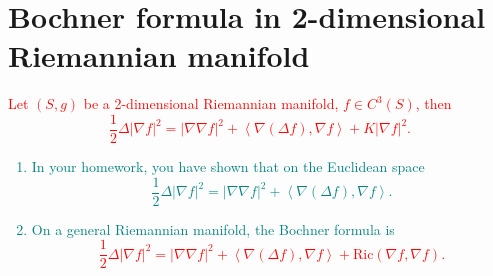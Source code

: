 \section{Bochner formula in 2-dimensional Riemannian manifold}
\textcolor{red}{
    \begin{theorem}
        Let \((S,g)\) be a 2-dimensional Riemannian manifold,
        \(f\in C^3(S)\), then
        \[
            \frac{1}{2}\Delta |\nabla f|^2 =|\nabla\nabla f|^2+\left\langle
                \nabla\left(\Delta f\right),\nabla f\right\rangle 
                +K|\nabla f|^2.   
        \]
    \end{theorem}
}
\textcolor{teal}{
    \begin{remark}
        \begin{enumerate}[(1)]
            \item In your homework, you have shown that on the
            Euclidean space
            \[\frac{1}{2}\Delta |\nabla f|^2 =|\nabla\nabla f|^2+\left\langle
                \nabla\left(\Delta f\right),\nabla f\right\rangle. \]
            \item On a general Riemannian manifold, the Bochner formula
            is
            \textcolor{red}{
                \[\frac{1}{2}\Delta |\nabla f|^2 =|\nabla\nabla f|^2+
                \left\langle\nabla\left(\Delta f\right),
                \nabla f\right\rangle 
                +\mathrm{Ric}(\nabla f,\nabla f).\]
            }
        \end{enumerate}
    \end{remark}
}
